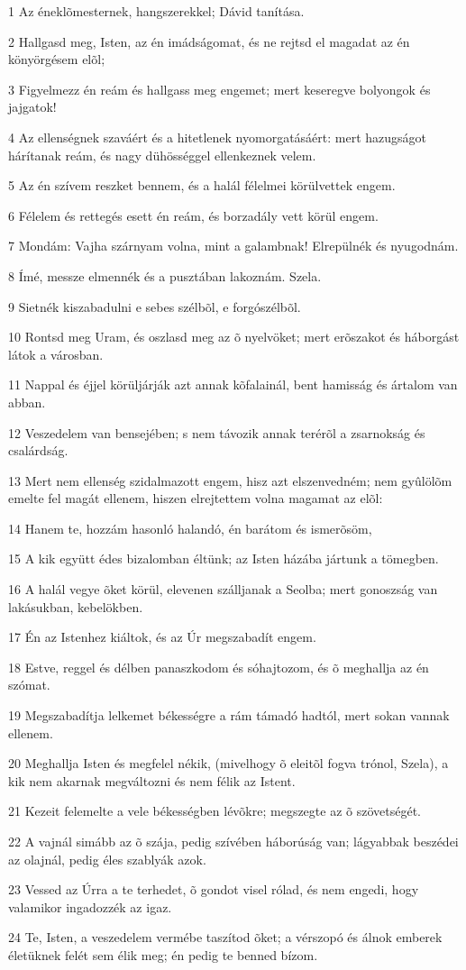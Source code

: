 \par 1 Az éneklõmesternek, hangszerekkel; Dávid tanítása.
\par 2 Hallgasd meg, Isten, az én imádságomat, és ne rejtsd el magadat az én könyörgésem elõl;
\par 3 Figyelmezz én reám és hallgass meg engemet; mert keseregve bolyongok és jajgatok!
\par 4 Az ellenségnek szaváért és a hitetlenek nyomorgatásáért: mert hazugságot hárítanak reám, és nagy dühösséggel ellenkeznek velem.
\par 5 Az én szívem reszket bennem, és a halál félelmei körülvettek engem.
\par 6 Félelem és rettegés esett én reám, és borzadály vett körül engem.
\par 7 Mondám: Vajha szárnyam volna, mint a galambnak! Elrepülnék és nyugodnám.
\par 8 Ímé, messze elmennék és a pusztában lakoznám. Szela.
\par 9 Sietnék kiszabadulni e sebes szélbõl, e forgószélbõl.
\par 10 Rontsd meg Uram, és oszlasd meg az õ nyelvöket; mert erõszakot és háborgást látok a városban.
\par 11 Nappal és éjjel körüljárják azt annak kõfalainál, bent hamisság és ártalom van abban.
\par 12 Veszedelem van bensejében; s nem távozik annak terérõl a zsarnokság és csalárdság.
\par 13 Mert nem ellenség szidalmazott engem, hisz azt elszenvedném; nem gyûlölõm emelte fel magát ellenem, hiszen elrejtettem volna magamat az elõl:
\par 14 Hanem te, hozzám hasonló halandó, én barátom és ismerõsöm,
\par 15 A kik együtt édes bizalomban éltünk; az Isten házába jártunk a tömegben.
\par 16 A halál vegye õket körül, elevenen szálljanak a Seolba; mert gonoszság van lakásukban, kebelökben.
\par 17 Én az Istenhez kiáltok, és az Úr megszabadít engem.
\par 18 Estve, reggel és délben panaszkodom és sóhajtozom, és õ meghallja az én szómat.
\par 19 Megszabadítja lelkemet békességre a rám támadó hadtól, mert sokan vannak ellenem.
\par 20 Meghallja Isten és megfelel nékik, (mivelhogy õ eleitõl fogva trónol, Szela), a kik nem akarnak megváltozni és nem félik az Istent.
\par 21 Kezeit felemelte a vele békességben lévõkre; megszegte az õ szövetségét.
\par 22 A vajnál simább az õ szája, pedig szívében háborúság van; lágyabbak beszédei az olajnál, pedig éles szablyák azok.
\par 23 Vessed az Úrra a te terhedet, õ gondot visel rólad, és nem engedi, hogy valamikor ingadozzék az igaz.
\par 24 Te, Isten, a veszedelem vermébe taszítod õket; a vérszopó és álnok emberek életüknek felét sem élik meg; én pedig te benned bízom.


